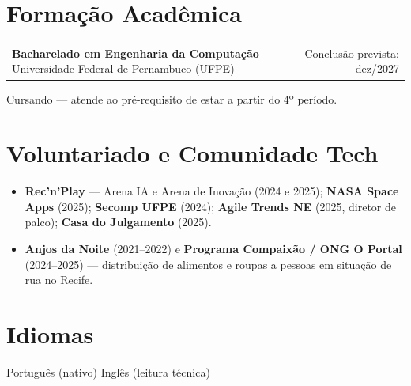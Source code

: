 \documentclass[a4paper,10.5pt]{article}
\makeatletter
\newcommand{\cargo}[3]{%
  \vspace{2pt}
  \begin{tabularx}{\textwidth}{@{}Xr@{}}
    \textbf{#1} \textnormal{\textbar{} #2} & \textcolor{muted}{#3}
  \end{tabularx}%
  \vspace{1pt}
}
\makeatother
\begin{document}
\section{Formação Acadêmica}
\cargo{Bacharelado em Engenharia da Computação}{Universidade Federal de Pernambuco (UFPE)}{Conclusão prevista: dez/2027}
\vspace{2pt}
Cursando --- atende ao pré-requisito de estar a partir do 4º período.

\section{Voluntariado e Comunidade Tech}
\begin{itemize}
  \item \textbf{Rec'n'Play} --- Arena IA e Arena de Inovação (2024 e 2025); \textbf{NASA Space Apps} (2025); \textbf{Secomp UFPE} (2024); \textbf{Agile Trends NE} (2025, diretor de palco); \textbf{Casa do Julgamento} (2025).
  \item \textbf{Anjos da Noite} (2021--2022) e \textbf{Programa Compaixão / ONG O Portal} (2024--2025) --- distribuição de alimentos e roupas a pessoas em situação de rua no Recife.
\end{itemize}

\section{Idiomas}
Português (nativo) \textbar{} Inglês (leitura técnica)
\end{document}
